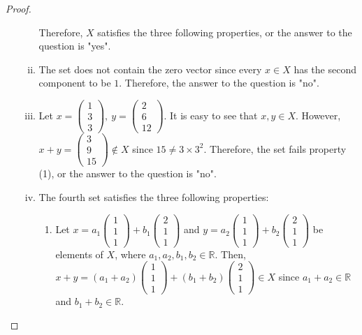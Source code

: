 \begin{proof}
\begin{enumerate}[(a)]
\begin{enumerate}[(i)]
        Therefore, $X$ satisfies the three following properties, or the answer to the question is "yes".
        \item The set does not contain the zero vector since every $x\in X$ has the second component to be $1$. Therefore, the answer to the question is "no".
        \item Let $x=\begin{pmatrix}1\\3\\3\end{pmatrix},\: y=\begin{pmatrix}2\\6\\12\end{pmatrix}$. It is easy to see that $x, y\in X$. However, $x+y=\begin{pmatrix}3\\9\\15\end{pmatrix}\not\in X$ since $15\not=3\times3^2$. Therefore, the set fails property (1), or the answer to the question is "no". 
        \item The fourth set satisfies the three following properties:
        \begin{enumerate}[(1)]
            \item Let $x = a_1\begin{pmatrix}1\\1\\1\end{pmatrix}+b_1\begin{pmatrix}2\\1\\1\end{pmatrix}$ and $y = a_2\begin{pmatrix}1\\1\\1\end{pmatrix}+b_2\begin{pmatrix}2\\1\\1\end{pmatrix}$ be elements of $X$, where $a_1, a_2, b_1, b_2\in\mathbb{R}$. Then, $x+y=(a_1+a_2)\begin{pmatrix}1\\1\\1\end{pmatrix}+(b_1+b_2)\begin{pmatrix}2\\1\\1\end{pmatrix}\in X$ since $a_1 + a_2\in\mathbb{R}$ and $b_1 + b_2\in\mathbb{R}$.

\end{enumerate}
\end{enumerate}
\end{enumerate}
\end{proof}
